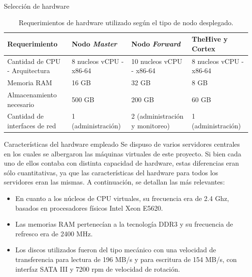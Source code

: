 \begin{subsection}{Selección de hardware}
    \begin{table}[H]
    \centering
    \begin{tabular}{|m{9em}|m{9em}|m{9em}|m{9em}|}
    \hline 
    Requerimiento  & Nodo \textit{Master} &  Nodo \textit{Forward} & TheHive y Cortex \\ 
    \hline
     Cantidad de CPU - Arquitectura & 8 nucleos vCPU - x86-64 & 10 nucleos vCPU - x86-64 & 8 nucleos vCPU - x86-64 \\ 
    \hline
    Memoria RAM  & 16 GB & 32 GB & 8 GB \\ 
    \hline
    Almacenamiento necesario & 500 GB  & 200 GB & 60 GB \\
    \hline
    Cantidad de interfaces de red & 1 (administración) & 2 (administración y monitoreo) & 1 (administración) \\
    \hline %
    \end{tabular}
    \caption{Requerimientos de hardware utilizado según el tipo de nodo desplegado.}
    \label{table:12}
    \end{table}
    \end{subsection}
    \pagebreak
    \begin{subsubsection}{Características del hardware empleado}
    Se dispuso de varios servidores centrales en los cuales se albergaron las máquinas virtuales de este proyecto. Si bien cada uno de ellos contaba con distinta capacidad de hardware, estas diferencias eran sólo cuantitativas, ya que las características del hardware para todos los servidores eran las mismas. A continuación, se detallan las más relevantes:
   \begin{itemize}
    \item En cuanto a los núcleos de CPU virtuales, su frecuencia era de 2.4 Ghz, basados en procesadores físicos Intel Xeon E5620.
    \item Las memorias RAM pertenecían a la tecnología DDR3 y su frecuencia de refresco era de 2400 MHz.
    \item Los discos utilizados fueron del tipo mecánico con una velocidad de transferencia para lectura de 196 MB/s y para escritura de 154 MB/s, con interfaz SATA III y 7200 rpm de velocidad de rotación.
    \end{itemize}
    \end{subsubsection}
    
